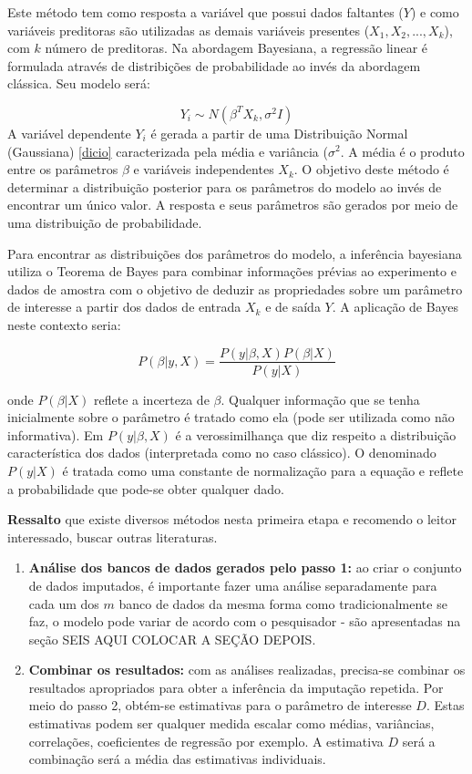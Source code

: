 \documentclass[
]{book}
\begin{document}
Este método tem como resposta a variável que possui dados faltantes (\(Y\)) e como variáveis preditoras são utilizadas as demais variáveis presentes (\(X_1, X_2,..., X_k\)), com \(k\) número de preditoras. Na abordagem Bayesiana, a regressão linear é formulada através de distribições de probabilidade ao invés da abordagem clássica. Seu modelo será:

\[Y_i \sim N(\beta^T X_k , \sigma ^2 I)\]
A variável dependente \(Y_i\) é gerada a partir de uma Distribuição Normal (Gaussiana) \ref{dicio} caracterizada pela média e variância (\(\sigma^2\). A média é o produto entre os parâmetros \(\beta\) e variáveis independentes \(X_k\). O objetivo deste método é determinar a distribuição posterior para os parâmetros do modelo ao invés de encontrar um único valor. A resposta e seus parâmetros são gerados por meio de uma distribuição de probabilidade.

Para encontrar as distribuições dos parâmetros do modelo, a inferência bayesiana utiliza o Teorema de Bayes para combinar informações prévias ao experimento e dados de amostra com o objetivo de deduzir as propriedades sobre um parâmetro de interesse a partir dos dados de entrada \(X_k\) e de saída \(Y\). A aplicação de Bayes neste contexto seria:

\begin{equation}
  P(\beta|y,X)=\frac{P(y|\beta,X)P(\beta|X)}{P(y|X)}
  \label{eq:reglinbayes}
\end{equation}

onde \(P(\beta|X)\) reflete a incerteza de \(\beta\). Qualquer informação que se tenha inicialmente sobre o parâmetro é tratado como ela (pode ser utilizada como não informativa).
Em \(P(y|\beta,X)\) é a verossimilhança que diz respeito a distribuição característica dos dados (interpretada como no caso clássico). O denominado \(P(y|X)\) é tratada como uma constante de normalização para a equação e reflete a probabilidade que pode-se obter qualquer dado.

\textbf{Ressalto} que existe diversos métodos nesta primeira etapa e recomendo o leitor interessado, buscar outras literaturas.

\begin{enumerate}
\def\labelenumi{\arabic{enumi}.}
\setcounter{enumi}{1}
\item
  \textbf{Análise dos bancos de dados gerados pelo passo 1:} ao criar o conjunto de dados imputados, é importante fazer uma análise separadamente para cada um dos \(m\) banco de dados da mesma forma como tradicionalmente se faz, o modelo pode variar de acordo com o pesquisador - são apresentadas na seção SEIS AQUI COLOCAR A SEÇÃO DEPOIS.
\item
  \textbf{Combinar os resultados:} com as análises realizadas, precisa-se combinar os resultados apropriados para obter a inferência da imputação repetida. Por meio do passo 2, obtém-se estimativas para o parâmetro de interesse \(D\). Estas estimativas podem ser qualquer medida escalar como médias, variâncias, correlações, coeficientes de regressão por exemplo. A estimativa \(D\) será a combinação será a média das estimativas individuais.
\end{enumerate}
\end{document}
